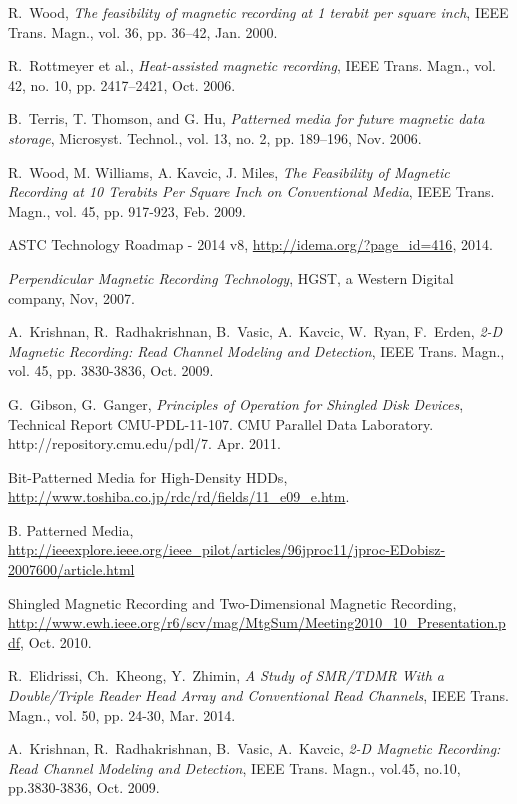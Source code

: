 \begin{thebibliography}{1}

R.~Wood, \emph{The feasibility of magnetic recording at 1 terabit per square
inch}, IEEE Trans. Magn., vol. 36, pp. 36–42, Jan. 2000.

R.~Rottmeyer et al., \emph{Heat-assisted magnetic recording}, IEEE Trans.
Magn., vol. 42, no. 10, pp. 2417–2421, Oct. 2006.

B.~Terris, T. Thomson, and G. Hu, \emph{Patterned media for future magnetic
data storage}, Microsyst. Technol., vol. 13, no. 2, pp. 189–196, Nov.
2006.

R.~Wood, M. Williams, A. Kavcic, J. Miles, \emph{The Feasibility of Magnetic Recording at 10 Terabits Per Square Inch on Conventional Media}, IEEE Trans. Magn., vol. 45, pp. 917-923, Feb. 2009.

ASTC Technology Roadmap - 2014 v8, \url{http://idema.org/?page_id=416}, 2014.

\emph{Perpendicular Magnetic Recording Technology}, HGST, a Western Digital company, Nov, 2007.

A.~Krishnan, R.~Radhakrishnan, B.~Vasic, A.~Kavcic, W.~Ryan, F.~Erden,
\emph{2-D Magnetic Recording: Read Channel Modeling and Detection}, IEEE Trans. Magn., vol. 45, pp. 3830-3836, Oct. 2009.


G.~Gibson, G.~Ganger, 
\emph{Principles of Operation for Shingled Disk Devices}, Technical Report
CMU-PDL-11-107. CMU Parallel Data Laboratory. http://repository.cmu.edu/pdl/7. Apr. 2011.

Bit-Patterned Media for High-Density HDDs, \url{http://www.toshiba.co.jp/rdc/rd/fields/11_e09_e.htm}.

B. Patterned Media, \url{http://ieeexplore.ieee.org/ieee_pilot/articles/96jproc11/jproc-EDobisz-2007600/article.html}

Shingled Magnetic Recording and Two-Dimensional Magnetic Recording, \url{http://www.ewh.ieee.org/r6/scv/mag/MtgSum/Meeting2010_10_Presentation.pdf}, Oct. 2010.

R.~Elidrissi, Ch.~Kheong, Y.~Zhimin,
\emph{A Study of SMR/TDMR With a Double/Triple Reader Head Array and Conventional Read Channels}, IEEE Trans. Magn., vol. 50, pp. 24-30, Mar. 2014.

A.~Krishnan, R.~Radhakrishnan, B.~Vasic, A.~Kavcic,
\emph{2-D Magnetic Recording: Read Channel Modeling and Detection}, IEEE Trans. Magn., vol.45, no.10, pp.3830-3836, Oct. 2009.

\end{thebibliography}
